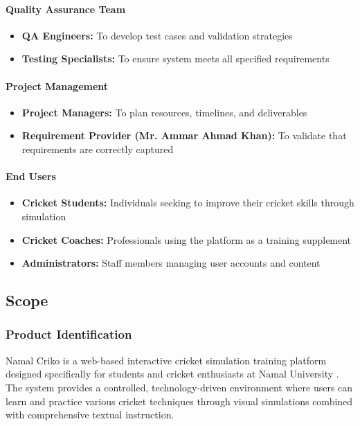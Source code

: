 \documentclass[12pt,a4paper]{article}
\begin{document}
\paragraph{Quality Assurance Team}
\begin{itemize}
    \item \textbf{QA Engineers:} To develop test cases and validation strategies
    \item \textbf{Testing Specialists:} To ensure system meets all specified requirements
\end{itemize}

\paragraph{Project Management}
\begin{itemize}
    \item \textbf{Project Managers:} To plan resources, timelines, and deliverables
    \item \textbf{Requirement Provider (Mr. Ammar Ahmad Khan):} To validate that requirements are correctly captured
\end{itemize}

\paragraph{End Users}
\begin{itemize}
    \item \textbf{Cricket Students:} Individuals seeking to improve their cricket skills through simulation
    \item \textbf{Cricket Coaches:} Professionals using the platform as a training supplement
    \item \textbf{Administrators:} Staff members managing user accounts and content
\end{itemize}

\subsection{Scope}

\subsubsection{Product Identification}
Namal Criko is a web-based interactive cricket simulation training platform designed specifically for students and cricket enthusiasts at Namal University . The system provides a controlled, technology-driven environment where users can learn and practice various cricket techniques through visual simulations combined with comprehensive textual instruction.
\end{document}
